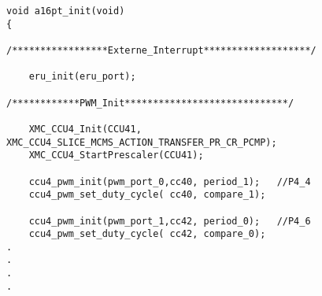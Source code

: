 \begin{minipage}{1\textwidth}
\begin{lstlisting}
void a16pt_init(void)
{

/*****************Externe_Interrupt*******************/

	eru_init(eru_port);

/************PWM_Init*****************************/

	XMC_CCU4_Init(CCU41, XMC_CCU4_SLICE_MCMS_ACTION_TRANSFER_PR_CR_PCMP);
	XMC_CCU4_StartPrescaler(CCU41);

	ccu4_pwm_init(pwm_port_0,cc40, period_1);	//P4_4
	ccu4_pwm_set_duty_cycle( cc40, compare_1);

	ccu4_pwm_init(pwm_port_1,cc42, period_0);	//P4_6
	ccu4_pwm_set_duty_cycle( cc42, compare_0);
.
.
.
.
\end{lstlisting}
\label{fig:a16pt.c}
\end{minipage}



